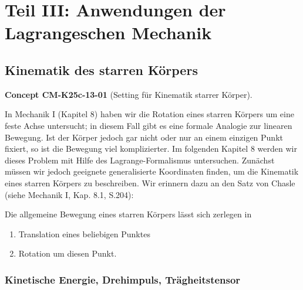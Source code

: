 \documentclass[10pt, letterpaper]{article}
\newcommand{\CustomHeading}[3]{%
  \par\medskip\noindent%
  \textbf{#1 #2} \textnormal{(#3)}.\enskip%
}
\newenvironment{CONC}[2]{\begin{unitbox}\CustomHeading{Concept}{#1}{#2}}{\end{unitbox}}
\begin{document}
\pagebreak





\section{Teil III: Anwendungen der Lagrangeschen Mechanik}





\subsection{Kinematik des starren Körpers}


\begin{CONC}{CM-K25c-13-01}{Setting für Kinematik starrer Körper}
In Mechanik I (Kapitel 8) haben wir die Rotation eines starren Körpers um eine feste Achse untersucht; in diesem Fall gibt es eine formale Analogie zur linearen Bewegung. Ist der Körper jedoch gar nicht oder nur an einem einzigen Punkt fixiert, so ist die Bewegung viel komplizierter. Im folgenden Kapitel 8 werden wir dieses Problem mit Hilfe des Lagrange-Formalismus untersuchen. Zunächst müssen wir jedoch geeignete generalisierte Koordinaten finden, um die Kinematik eines starren Körpers zu beschreiben. Wir erinnern dazu an den Satz von Chasle (siehe Mechanik I, Kap. 8.1, S.204):

Die allgemeine Bewegung eines starren Körpers lässt sich zerlegen in
\begin{enumerate}
\item Translation eines beliebigen Punktes
\item Rotation um diesen Punkt.
\end{enumerate}
\end{CONC}

\subsubsection{Kinetische Energie, Drehimpuls, Trägheitstensor}
\end{document}
